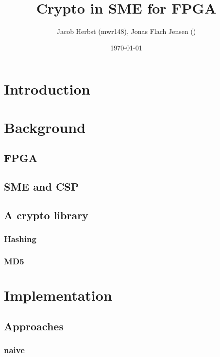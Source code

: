 \documentclass[a4paper]{article}
\author{Jacob Herbst (mwr148), Jonas Flach Jensen ()}
\date{\today}
\title{Crypto in SME for FPGA}
\begin{document}
\maketitle
\tableofcontents


\section{Introduction}
\label{sec:orge4faf94}

\section{Background}
\label{sec:org63f4e2f}

\subsection{FPGA}
\label{sec:orge933bac}

\subsection{SME and CSP}
\label{sec:org612454b}

\subsection{A crypto library}
\label{sec:org41d37f3}

\subsubsection{Hashing}
\label{sec:org891bb04}

\subsubsection{MD5}
\label{sec:org51afbf4}

\section{Implementation}
\label{sec:org842ceda}

\subsection{Approaches}
\label{sec:orgbf01c64}

\subsubsection{naive}
\label{sec:org14776ef}
\end{document}
